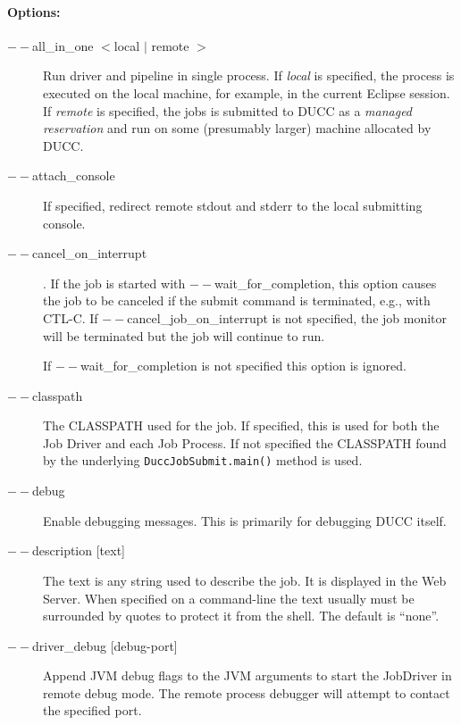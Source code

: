         \paragraph{Options:}
           \begin{description}

           \item[$--$all\_in\_one $<$local $|$ remote $>$]
               Run driver and pipeline in single process.  If {\em local} is specified, the
               process is executed on the local machine, for example, in the current Eclipse session.
               If {\em remote} is specified, the jobs is submitted to DUCC as a {\em managed reservation}
               and run on some (presumably larger) machine allocated by DUCC.

           \item[$--$attach\_console] If specified, redirect remote stdout and stderr
             to the local submitting console.

           \item[$--$cancel\_on\_interrupt].  If the job is started with $--$wait\_for\_completion, this
             option causes the job to be canceled if the submit command is terminated,
             e.g., with CTL-C. If $--$cancel\_job\_on\_interrupt is not
             specified, the job monitor will be terminated but the job will continue to run.

             If $--$wait\_for\_completion is not specified this option is ignored. 

           \item[$--$classpath] The CLASSPATH used for the job.  If specified, this is used
             for both the Job Driver and each Job Process. If not specified the CLASSPATH found by the underlying
             {\tt DuccJobSubmit.main()} method is used.

           \item[$--$debug] Enable debugging messages. This is primarily for debugging DUCC itself.

           \item[$--$description {[text]}] The text is any string used to describe the job. It is
             displayed in the Web Server. When specified on a command-line the text usually 
             must be surrounded by quotes to protect it from the shell.  The default is ``none''.

           \item[$--$driver\_debug {[debug-port]}] Append JVM debug flags to the JVM arguments
             to start the JobDriver in remote debug mode.  The remote process debugger will attempt
             to contact the specified port.


\end{description}
